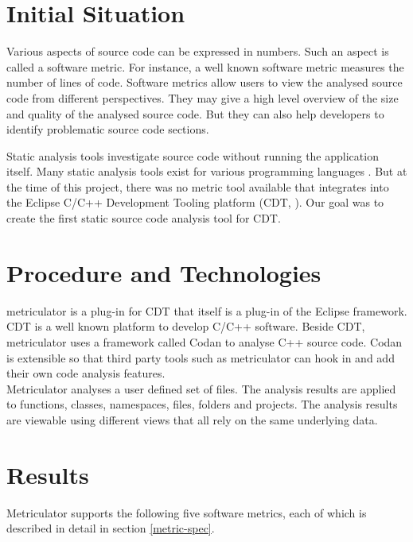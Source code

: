\documentclass[11pt,a4paper,oneside]{scrreprt}
\begin{document}
\section*{Initial Situation}
Various aspects of source code can be expressed in numbers. Such an aspect is called a software metric. For instance, a well known software metric measures the number of lines of code. Software metrics allow users to view the analysed source code from different perspectives. They may give a high level overview of the size and quality of the analysed source code. But they can also help developers to identify problematic source code sections.

Static analysis tools investigate source code without running the application itself. Many static analysis tools exist for various programming languages \cite{metrictools}. But at the time of this project, there was no metric tool available that integrates into the Eclipse C/C++ Development Tooling platform (CDT, \cite{CDT}). Our goal was to create the first static source code analysis tool for CDT.

\section*{Procedure and Technologies}
metriculator is a plug-in for CDT that itself is a plug-in of the Eclipse framework. CDT is a well known platform to develop C/C++ software. Beside CDT, metriculator uses a framework called Codan \cite{codan} to analyse C++ source code. Codan is extensible so that third party tools such as metriculator can hook in and add their own code analysis features.\\
Metriculator analyses a user defined set of files. The analysis results are applied to functions, classes, namespaces, files, folders and projects. The analysis results are viewable using different views that all rely on the same underlying data.

\section*{Results}
Metriculator supports the following five software metrics, each of which is described in detail in section \ref{metric-spec}.
\end{document}
